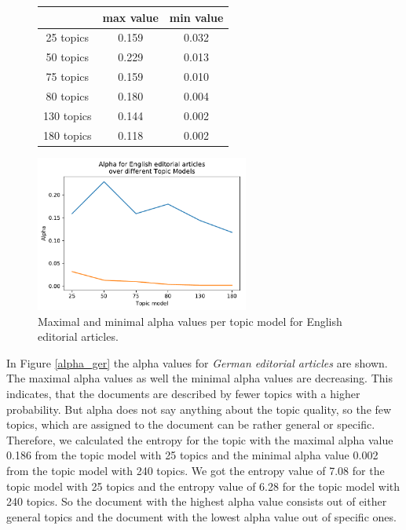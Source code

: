 \begin{figure}
	\begin{minipage}{0.5\textwidth}
		\centering
		\begin{tabular}[t]{c|cc}
			&max value & min value\\
			\hline
			25 topics&0.159&0.032\\
			50 topics&0.229&0.013\\
			75 topics&0.159&0.010\\
			80 topics&	0.180&0.004\\
			130 topics &0.144&0.002\\
			180 topics&	0.118&0.002\\
		\end{tabular}
	\end{minipage}%
	\begin{minipage}{0.5\textwidth}
		\centering
		\includegraphics[width=7cm]{gfx/Eval_IC/English_Editorial_Alpha.pdf}
	\end{minipage}
	\caption{Maximal and minimal alpha values per topic model for English editorial articles.}
	\label{alpha_eng}
\end{figure}
In Figure \ref{alpha_ger} the alpha values for \textit{German editorial articles} are shown. The maximal alpha values as well the minimal alpha values are decreasing. This indicates, that the documents are described by fewer topics with a higher probability. But alpha does not say anything about the topic quality, so the few topics, which are assigned to the document can be rather general or specific. Therefore, we calculated the entropy for the topic with the maximal alpha value 0.186 from the topic model with 25 topics and the minimal alpha value 0.002 from the topic model with 240 topics. We got the entropy value of 7.08 for the topic model with 25 topics and the entropy value of 6.28 for the topic model with 240 topics. So the document with the highest alpha value consists out of either general topics and the document with the lowest alpha value out of specific ones. 

